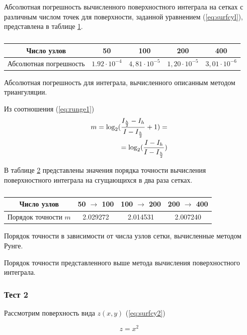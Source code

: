 \documentclass{article}
\begin{document}
Абсолютная погрешность вычисленного поверхностного интеграла на сетках с различным числом точек для поверхности, заданной уравнением (\ref{eq:surfcyl}), представлена в таблице \ref{table:abspogcylinder}.

\begin{table}[ht]
\centering
\begin{tabular}{|c|c|c|c|c|}
\hline
 Число узлов			& 50					& 100					& 200					& 400		\\ 
\hline
 Абсолютная погрешность & $1.92 \cdot 10^{-4}$	& $4,81 \cdot 10^{-5}$	& $1,20 \cdot 10^{-5}$	& $3,01 \cdot 10^{-6}$	\\  
\hline
\end{tabular}
\caption{\label{table:abspogcylinder}}
Абсолютная погрешность для интеграла, вычисленного описанным методом триангуляции.
\end{table}

Из соотношения (\ref{eq:runge1})
\begin{align}\label{eq:runge2}
m = \log_2(\frac{I_{\frac{h}{2}}-I_{h}}{I-I_{\frac{h}{2}}}+1) = \notag \\ 
= \log_2(\frac{I-I_{h}}{I-I_{\frac{h}{2}}})
\end{align}

В таблице \ref{table:porTochCylinder} представлены значения порядка точности вычисления поверхностного интеграла на сгущающихся в два раза сетках.

\begin{table}[ht]
\centering
\begin{tabular}{|c|c|c|c|}
\hline
 Число узлов		& 50 $\rightarrow$ 100	& 100 $\rightarrow$ 200	& 200 $\rightarrow$ 400	\\ 
\hline
 Порядок точности $m$	& 2.029272	& 2.014531	& 2.007240	\\  
\hline
\end{tabular}
\caption{\label{table:porTochCylinder}}
Порядок точности в зависимости от числа узлов сетки, вычисленные методом Рунге.
\end{table}

Порядок точности представленного выше метода вычисления поверхностного интеграла.

\subsubsection*{Тест 2}

Рассмотрим поверхность вида $z(x,y)$ (\ref{eq:surfcy2})

\begin{equation}\label{eq:surfcy2}
z = x^2
\end{equation}
\end{document}
